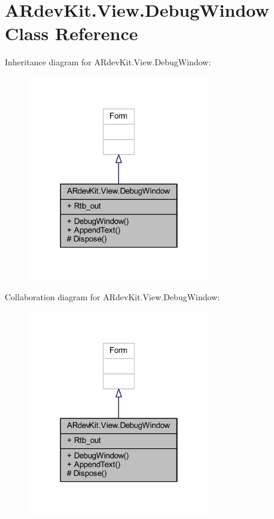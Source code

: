\hypertarget{class_a_rdev_kit_1_1_view_1_1_debug_window}{\section{A\-Rdev\-Kit.\-View.\-Debug\-Window Class Reference}
\label{class_a_rdev_kit_1_1_view_1_1_debug_window}
}


Inheritance diagram for A\-Rdev\-Kit.\-View.\-Debug\-Window\-:
\nopagebreak
\begin{figure}[H]
\begin{center}
\leavevmode
\includegraphics[width=226pt]{class_a_rdev_kit_1_1_view_1_1_debug_window__inherit__graph}
\end{center}
\end{figure}


Collaboration diagram for A\-Rdev\-Kit.\-View.\-Debug\-Window\-:
\nopagebreak
\begin{figure}[H]
\begin{center}
\leavevmode
\includegraphics[width=226pt]{class_a_rdev_kit_1_1_view_1_1_debug_window__coll__graph}
\end{center}
\end{figure}
